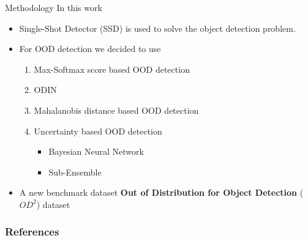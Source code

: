 \documentclass[10pt, aspectratio=169]{beamer}
\begin{document}
\begin{frame}{Methodology}
    In this work
    \begin{itemize}
        \item Single-Shot Detector (SSD) is used to solve the object detection problem.
        \item For OOD detection we decided to use
        \begin{enumerate}
            \item Max-Softmax score based OOD detection
            \item ODIN
            \item Mahalanobis distance based OOD detection
            \item Uncertainty based OOD detection
                \begin{itemize}
                    \item Bayesian Neural Network
                    \item Sub-Ensemble
                \end{itemize} 
        \end{enumerate}
        \item A new benchmark dataset \textbf{Out of Distribution for Object Detection} ($OD^2$) dataset
    \end{itemize}
\end{frame}



\begin{frame}[allowframebreaks]
    \frametitle{References}
    
    
\end{frame}
\end{document}
